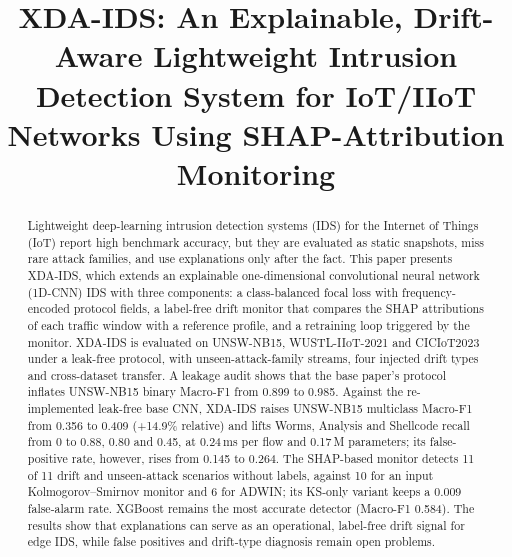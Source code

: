 \documentclass[conference]{IEEEtran}
\begin{document}
\title{XDA-IDS: An Explainable, Drift-Aware Lightweight Intrusion Detection System for IoT/IIoT Networks Using SHAP-Attribution Monitoring}

\author{
\and
{}
}

\maketitle

\begin{abstract}
Lightweight deep-learning intrusion detection systems (IDS) for the Internet of Things (IoT) report high benchmark accuracy, but they are evaluated as static snapshots, miss rare attack families, and use explanations only after the fact. This paper presents XDA-IDS, which extends an explainable one-dimensional convolutional neural network (1D-CNN) IDS with three components: a class-balanced focal loss with frequency-encoded protocol fields, a label-free drift monitor that compares the SHAP attributions of each traffic window with a reference profile, and a retraining loop triggered by the monitor. XDA-IDS is evaluated on UNSW-NB15, WUSTL-IIoT-2021 and CICIoT2023 under a leak-free protocol, with unseen-attack-family streams, four injected drift types and cross-dataset transfer. A leakage audit shows that the base paper's protocol inflates UNSW-NB15 binary Macro-F1 from 0.899 to 0.985. Against the re-implemented leak-free base CNN, XDA-IDS raises UNSW-NB15 multiclass Macro-F1 from 0.356 to 0.409 (+14.9\% relative) and lifts Worms, Analysis and Shellcode recall from 0 to 0.88, 0.80 and 0.45, at 0.24\,ms per flow and 0.17\,M parameters; its false-positive rate, however, rises from 0.145 to 0.264. The SHAP-based monitor detects 11 of 11 drift and unseen-attack scenarios without labels, against 10 for an input Kolmogorov--Smirnov monitor and 6 for ADWIN; its KS-only variant keeps a 0.009 false-alarm rate. XGBoost remains the most accurate detector (Macro-F1 0.584). The results show that explanations can serve as an operational, label-free drift signal for edge IDS, while false positives and drift-type diagnosis remain open problems.
\end{abstract}
\end{document}
